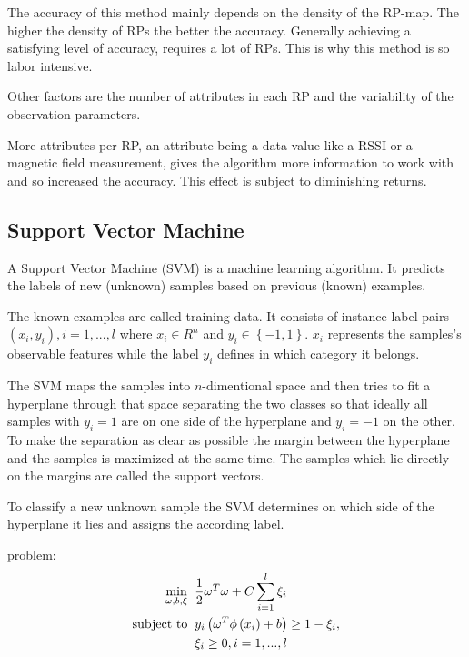 The accuracy of this method mainly depends on the density of the RP-map. The higher the density of RPs the better the accuracy. Generally achieving a satisfying level of accuracy, requires a lot of RPs. This is why this method is so labor intensive.

Other factors are the number of attributes in each RP and the variability of the observation parameters.

More attributes per RP, an attribute being a data value like a RSSI or a magnetic field measurement, gives the algorithm more information to work with and so increased the accuracy\cite{Li2012feasableMagnetic}. This effect is subject to diminishing returns\cite{brouwers2014incremental}.


\subsection{Support Vector Machine}
A Support Vector Machine (SVM) is a machine learning algorithm. It predicts the labels of new (unknown) samples based on previous (known) examples. 

The known examples are called training data. It consists of instance-label pairs \(\left ( x_{i}, y_{i} \right ), i=1,...,l\) where \(x_{i}\in R^{n}\) and \(y_{i}\in \left \{ -1,1 \right \}\). \(x_{i}\) represents the samples's observable features while the label \(y_{i}\) defines in which category it belongs.

The SVM maps the samples into \(n\)-dimentional space and then tries to fit a hyperplane through that space separating the two classes so that ideally all samples with \(y_{i}=1\) are on one side of the hyperplane and \(y_{i}=-1\) on the other. To make the separation as clear as possible the margin between the hyperplane and the samples is maximized at the same time. The samples which lie directly on the margins are called the support vectors.

To classify a new unknown sample the SVM determines on which side of the hyperplane it lies and assigns the according label.

 problem\cite{chang2011libsvm}:
\begin{equation}
\begin{split}
\min_{\omega , b ,\xi}\;\; & \frac{1}{2}\omega^{T}\omega +C\sum_{i=1}^{l}\xi_{i}\\
\textup{subject to}\;\; & y_{i}\left ( \omega^{T}\phi \left ( x_{i} \right )+b \right )\geq 1-\xi_{i},\\
& \xi_{i}\geq 0,i=1,...,l
\end{split}
\end{equation}

